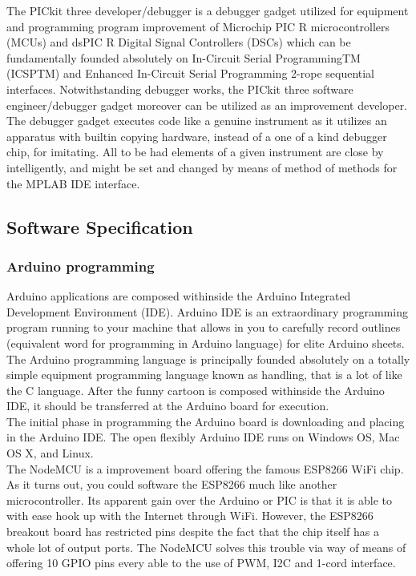 \documentclass[12pt,a4paper]{article}
\begin{document}
The PICkit three developer/debugger is a debugger gadget utilized for equipment and programming program improvement of Microchip PIC R microcontrollers (MCUs) and dsPIC R Digital Signal Controllers (DSCs) which can be fundamentally founded absolutely on In-Circuit Serial ProgrammingTM (ICSPTM) and Enhanced In-Circuit Serial Programming 2-rope sequential interfaces. Notwithstanding debugger works, the PICkit three software engineer/debugger gadget moreover can be utilized as an improvement developer. \\

The debugger gadget executes code like a genuine instrument as it utilizes an apparatus with builtin copying hardware, instead of a one of a kind debugger chip, for imitating. All to be had elements of a given instrument are close by intelligently, and might be set and changed by means of method of methods for the MPLAB IDE interface.\\

\subsection{Software Specification}

\subsubsection{ Arduino programming}
\hspace{0.5cm} Arduino applications are composed withinside the Arduino Integrated Development Environment (IDE). 
Arduino IDE is an extraordinary programming program running to your machine that allows in you to carefully record outlines 
(equivalent word for programming in Arduino language) for elite Arduino sheets. The Arduino programming language is principally founded absolutely on a totally simple equipment programming language known as handling, 
that is a lot of like the C language. After the funny cartoon is composed withinside the Arduino IDE, it should be 
transferred at the Arduino board for execution. \\

The initial phase in programming the Arduino board is downloading and placing in the Arduino 
IDE. The open flexibly Arduino IDE runs on Windows OS, Mac OS X, and Linux.\\

The NodeMCU is a improvement board offering the famous ESP8266 WiFi chip. As it
turns out, you could software the ESP8266 much like another microcontroller. Its apparent gain over the Arduino or PIC is that it is able to with ease hook up with the Internet through WiFi. However,
the ESP8266 breakout board has restricted pins despite the fact that the chip itself has a whole lot of output ports.
The NodeMCU solves this trouble via way of means of offering 10 GPIO pins every able to the use of PWM, I2C
and 1-cord interface.\\
\end{document}
